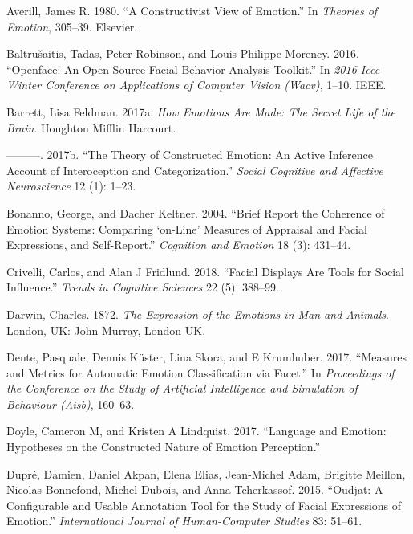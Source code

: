 \documentclass[conference,final,]{IEEEtran}
\begin{document}
\hypertarget{refs}{}
\leavevmode\hypertarget{ref-averill1980constructivist}{}%
Averill, James R. 1980. ``A Constructivist View of Emotion.'' In
\emph{Theories of Emotion}, 305--39. Elsevier.

\leavevmode\hypertarget{ref-baltruvsaitis2016openface}{}%
Baltrušaitis, Tadas, Peter Robinson, and Louis-Philippe Morency. 2016.
``Openface: An Open Source Facial Behavior Analysis Toolkit.'' In
\emph{2016 Ieee Winter Conference on Applications of Computer Vision
(Wacv)}, 1--10. IEEE.

\leavevmode\hypertarget{ref-barrett2017emotions}{}%
Barrett, Lisa Feldman. 2017a. \emph{How Emotions Are Made: The Secret
Life of the Brain}. Houghton Mifflin Harcourt.

\leavevmode\hypertarget{ref-barrett2017theory}{}%
---------. 2017b. ``The Theory of Constructed Emotion: An Active
Inference Account of Interoception and Categorization.'' \emph{Social
Cognitive and Affective Neuroscience} 12 (1): 1--23.

\leavevmode\hypertarget{ref-bonanno2004brief}{}%
Bonanno, George, and Dacher Keltner. 2004. ``Brief Report the Coherence
of Emotion Systems: Comparing `on-Line' Measures of Appraisal and Facial
Expressions, and Self-Report.'' \emph{Cognition and Emotion} 18 (3):
431--44.

\leavevmode\hypertarget{ref-crivelli2018facial}{}%
Crivelli, Carlos, and Alan J Fridlund. 2018. ``Facial Displays Are Tools
for Social Influence.'' \emph{Trends in Cognitive Sciences} 22 (5):
388--99.

\leavevmode\hypertarget{ref-darwin1872expression}{}%
Darwin, Charles. 1872. \emph{The Expression of the Emotions in Man and
Animals}. London, UK: John Murray, London UK.

\leavevmode\hypertarget{ref-dente2017measures}{}%
Dente, Pasquale, Dennis Küster, Lina Skora, and E Krumhuber. 2017.
``Measures and Metrics for Automatic Emotion Classification via Facet.''
In \emph{Proceedings of the Conference on the Study of Artificial
Intelligence and Simulation of Behaviour (Aisb)}, 160--63.

\leavevmode\hypertarget{ref-doyle2017language}{}%
Doyle, Cameron M, and Kristen A Lindquist. 2017. ``Language and Emotion:
Hypotheses on the Constructed Nature of Emotion Perception.''

\leavevmode\hypertarget{ref-dupre2015oudjat}{}%
Dupré, Damien, Daniel Akpan, Elena Elias, Jean-Michel Adam, Brigitte
Meillon, Nicolas Bonnefond, Michel Dubois, and Anna Tcherkassof. 2015.
``Oudjat: A Configurable and Usable Annotation Tool for the Study of
Facial Expressions of Emotion.'' \emph{International Journal of
Human-Computer Studies} 83: 51--61.
\end{document}
